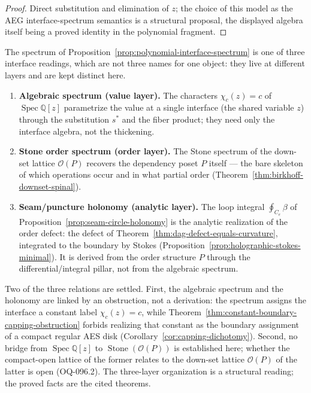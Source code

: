 \begin{proof}
Direct substitution and elimination of $z$; the choice of this model as the AEG
interface-spectrum semantics is a structural proposal, the displayed algebra
itself being a proved identity in the polynomial fragment.
\end{proof}

\begin{remark}
\label{rem:three-interface-layers}
The spectrum of Proposition~\ref{prop:polynomial-interface-spectrum} is one of
three interface readings, which are not three names for one object: they live at
different layers and are kept distinct here.
\begin{enumerate}
  \item \textbf{Algebraic spectrum (value layer).} The characters
  $\chi_c(z)=c$ of $\operatorname{Spec}\mathbb Q[z]$ parametrize the value at a
  single interface (the shared variable $z$) through the substitution $s^*$ and
  the fiber product; they need only the interface algebra, not the thickening.
  \item \textbf{Stone order spectrum (order layer).} The Stone spectrum of the
  down-set lattice $\mathcal O(P)$ recovers the dependency poset $P$ itself ---
  the bare skeleton of which operations occur and in what partial order
  (Theorem~\ref{thm:birkhoff-downset-spinal}).
  \item \textbf{Seam/puncture holonomy (analytic layer).} The loop integral
  $\oint_{C_e}\beta$ of Proposition~\ref{prop:seam-circle-holonomy} is the
  analytic realization of the order defect: the defect of
  Theorem~\ref{thm:dag-defect-equals-curvature}, integrated to the boundary by
  Stokes (Proposition~\ref{prop:holographic-stokes-minimal}).  It is derived
  from the order structure $P$ through the differential/integral pillar, not
  from the algebraic spectrum.
\end{enumerate}
Two of the three relations are settled.  First, the algebraic spectrum and the
holonomy are linked by an obstruction, not a derivation: the spectrum assigns
the interface a constant label $\chi_c(z)=c$, while
Theorem~\ref{thm:constant-boundary-capping-obstruction} forbids realizing that
constant as the boundary assignment of a compact regular AES disk
(Corollary~\ref{cor:capping-dichotomy}).  Second, no bridge from
$\operatorname{Spec}\mathbb Q[z]$ to
$\operatorname{Stone}(\mathcal O(P))$ is established here; whether the
compact-open lattice of the former relates to the down-set lattice $\mathcal
O(P)$ of the latter is open (OQ-096.2).  The three-layer organization is a
structural reading; the proved facts are the cited theorems.
\end{remark}

